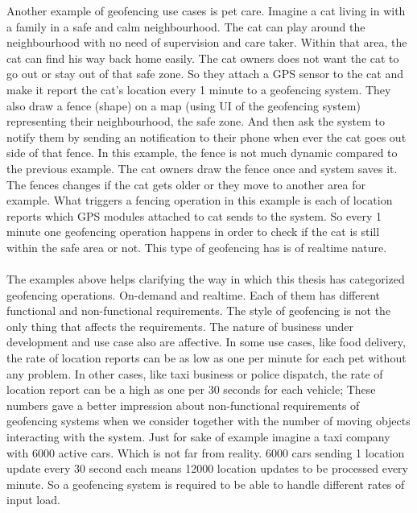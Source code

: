 \documentclass[a4]{report}
\begin{document}
    Another example of geofencing use cases is pet care.
    Imagine a cat living in with a family in a safe and calm neighbourhood.
    The cat can play around the neighbourhood with no need of supervision and care taker.
    Within that area, the cat can find his way back home easily.
    The cat owners does not want the cat to go out or stay out of that safe zone.
    So they attach a GPS sensor to the cat and make it report the cat's location every 1 minute to a geofencing system.
    They also draw a fence (shape) on a map (using UI of the geofencing system) representing their neighbourhood, the
    safe zone.
    And then ask the system to notify them by sending an notification to their phone when ever the cat goes out side
    of that fence.
    In this example, the fence is not much dynamic compared to the previous example.
    The cat owners draw the fence once and system saves it.
    The fences changes if the cat gets older or they move to another area for example.
    What triggers a fencing operation in this example is each of location reports which GPS modules attached to cat
    sends to the system.
    So every 1 minute one geofencing operation happens in order to check if the cat is still within the safe area or
    not.
    This type of geofencing has is of realtime nature.

    \paragraph{}
    The examples above helps clarifying the way in which this thesis has categorized geofencing operations.
    On-demand and realtime.
    Each of them has different functional and non-functional requirements.
    The style of geofencing is not the only thing that affects the requirements.
    The nature of business under development and use case also are affective.
    In some use cases, like food delivery, the rate of location reports can be as low as one per minute for each
    pet without any problem.
    In other cases, like taxi business or police dispatch, the rate of location report can be a high as one per 30
    seconds for each vehicle;
    These numbers gave a better impression about non-functional requirements of geofencing systems when we consider
    together with the number of moving objects interacting with the system.
    Just for sake of example imagine a taxi company with 6000 active cars.
    Which is not far from reality.
    6000 cars sending 1 location update every 30 second each means 12000 location updates to be processed every
    minute.
    So a geofencing system is required to be able to handle different rates of input load.
\end{document}
